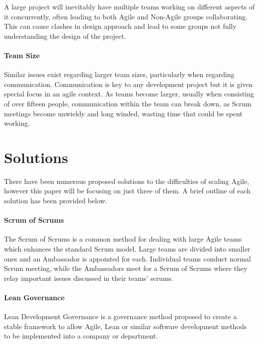 \documentclass{scrartcl}
\begin{document}
A large project will inevitably have multiple teams working on different aspects of it concurrently, often leading to both Agile and Non-Agile groups collaborating. This can cause clashes in design approach and lead to some groups not fully understanding the design of the project. 

 

\paragraph{Team Size}\mbox{}\newline

Similar issues exist regarding larger team sizes, particularly when regarding communication. Communication is key to any development project but it is given special focus in an agile context. \cite{stoica2013software} As teams become larger, usually when consisting of over fifteen people, \cite{ambler2009agile} communication within the team can break down, as Scrum meetings become unwieldy and long winded, wasting time that could be spent working.

\section{Solutions}

There have been numerous proposed solutions to the difficulties of scaling Agile, however this paper will be focusing on just three of them. A brief outline of each solution has been provided below.

\paragraph{Scrum of Scrums}\mbox{}\newline

The Scrum of Scrums is a common method for dealing with large Agile teams which enhances the standard Scrum model. Large teams are divided into smaller ones and an Ambassador is appointed for each. Individual teams conduct normal Scrum meeting, while the Ambassadors meet for a Scrum of Scrums where they relay important issues discussed in their teams' scrums.

\paragraph{Lean Governance}\mbox{}\newline

Lean Development Governance is a governance method proposed to create a stable framework to allow Agile, Lean or similar software development methods to be implemented into a company or department.
\end{document}
